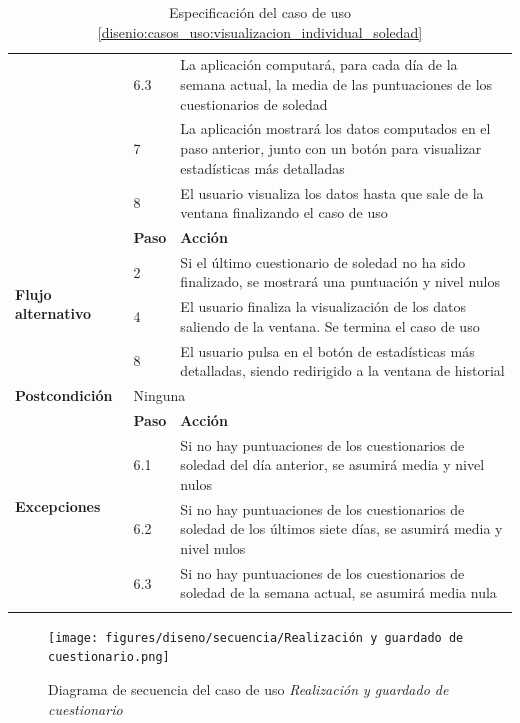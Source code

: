 \begin{table}[h]
\begin{tabularx}{\textwidth}{|l|l|X|}
                    \cline{2-3} & 6.3 & La aplicación computará, para cada día de la semana actual, la media de las puntuaciones de los cuestionarios de soledad \\
                    \cline{2-3} & 7 & La aplicación mostrará los datos computados en el paso anterior, junto con un botón para visualizar estadísticas más detalladas \\
                    \cline{2-3} & 8 & El usuario visualiza los datos hasta que sale de la ventana finalizando el caso de uso \\
                    \hline
                    \multirow{4}{*}{\textbf{Flujo alternativo}} & \textbf{Paso} & \textbf{Acción} \\
                    \cline{2-3} & 2 & Si el último cuestionario de soledad no ha sido finalizado, se mostrará una puntuación y nivel nulos \\
                    \cline{2-3} & 4 & El usuario finaliza la visualización de los datos saliendo de la ventana. Se termina el caso de uso \\
                    \cline{2-3} & 8 & El usuario pulsa en el botón de estadísticas más detalladas, siendo redirigido a la ventana de historial \\
                    \hline
                    \textbf{Postcondición} & \multicolumn{2}{|X|}{Ninguna} \\
                    \hline
                    \multirow{4}{*}{\textbf{Excepciones}}  & \textbf{Paso} & \textbf{Acción} \\
                    \cline{2-3} & 6.1 & Si no hay puntuaciones de los cuestionarios de soledad del día anterior, se asumirá media y nivel nulos \\
                    \cline{2-3} & 6.2 & Si no hay puntuaciones de los cuestionarios de soledad de los últimos siete días, se asumirá media y nivel nulos \\
                    \cline{2-3} & 6.3 & Si no hay puntuaciones de los cuestionarios de soledad de la semana actual, se asumirá media nula \\
                    \hline
                    \caption{Especificación del caso de uso \ref{disenio:casos_uso:visualizacion_individual_soledad}}
                    \label{tabla:casos_uso:visualizacion_individual_soledad}
                \end{tabularx}
            \end{table}

            \begin{figure}[h]
                \centering
                \texttt{[image: figures/diseno/secuencia/Realización y guardado de cuestionario.png]}
                \caption{Diagrama de secuencia del caso de uso \textit{Realización y guardado de cuestionario}}
                \label{figure:diagrama_secuencia:realizacion_guardado_cuestionario}
            \end{figure}
            
